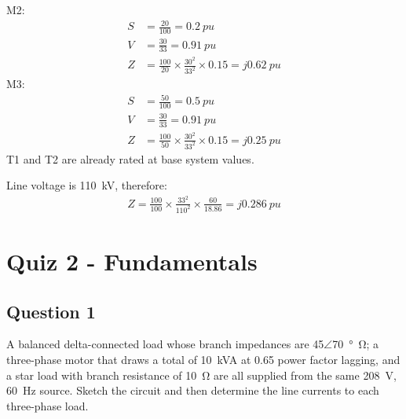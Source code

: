 M2:
\begin{align}
    S & = \frac{20}{100} = \SI{0.2}{pu}                                      \\
    V & = \frac{30}{33} = \SI{0.91}{pu}                                      \\
    Z & = \frac{100}{20}\times \frac{30^2}{33^2}\times 0.15 = j\SI{0.62}{pu}
\end{align}
M3:
\begin{align}
    S & = \frac{50}{100} = \SI{0.5}{pu}                                      \\
    V & = \frac{30}{33} = \SI{0.91}{pu}                                      \\
    Z & = \frac{100}{50}\times \frac{30^2}{33^2}\times 0.15 = j\SI{0.25}{pu}
\end{align}
T1 and T2 are already rated at base system values.

Line voltage is \SI{110}{kV}, therefore:
\begin{gather}
    Z = \frac{100}{100}\times \frac{33^2}{110^2}\times \frac{60}{18.86} = j\SI{0.286}{pu}
\end{gather}
\chapter{Quiz 2 - Fundamentals}
\section{Question 1}
A balanced delta-connected load whose branch impedances are 45$\angle$\SI{70}{\degree\ohm}; a three-phase motor that draws a total of \SI{10}{kVA} at 0.65 power factor lagging, and a star load with branch resistance of \SI{10}{\ohm} are all supplied from the same \SI{208}{\volt}, \SI{60}{\hertz} source. Sketch the circuit and then determine the line currents to each three-phase load.

